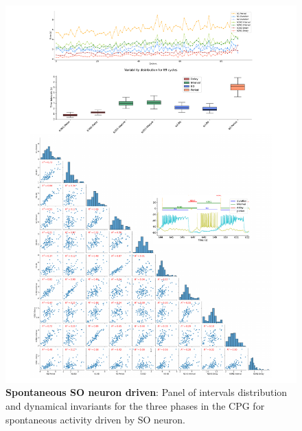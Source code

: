 \begin{figure}[htbp]
	\centering
	\includegraphics[width=1.1\textwidth]{./invariants/data/SUSSEX/prep4_so_driven_2/images/panel_with_pairplot.pdf}
	\caption{\textbf{Spontaneous SO neuron driven}: Panel of intervals distribution and dynamical invariants for the three phases in the CPG for spontaneous activity driven by SO neuron.}
	\label{fig:so spontaneous invariants pairplot}
\end{figure}
 	


